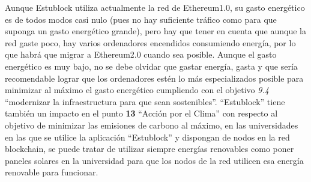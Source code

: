 Aunque Estublock utiliza actualmente la red de Ethereum1.0, su gasto energético es de todos modos casi nulo (pues no hay suficiente tráfico como para que suponga un gasto energético grande), pero hay que tener en cuenta que aunque la red gaste poco, hay varios ordenadores encendidos consumiendo energía, por lo que habrá que migrar a Ethereum2.0 cuando sea posible. Aunque el gasto energético es muy bajo, no se debe olvidar que gastar energía, gasta y que sería recomendable lograr que los ordenadores estén lo más especializados posible para minimizar al máximo el gasto energético cumpliendo con el objetivo \textit{9.4} ``modernizar la infraestructura para que sean sostenibles''. ``Estublock'' tiene también un impacto en el punto \textbf{13} ``Acción por el Clima'' con respecto al objetivo de minimizar las emisiones de carbono al máximo, en las universidades en las que se utilice la aplicación ``Estublock'' y dispongan de nodos en la red blockchain, se puede tratar de utilizar siempre energías renovables como poner paneles solares en la universidad para que los nodos de la red utilicen esa energía renovable para funcionar.


